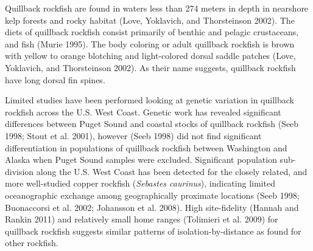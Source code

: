\documentclass[11pt,
  english,
  a4paper,
]{article}
\begin{document}

Quillback rockfish are found in waters less than 274 meters in depth in nearshore kelp forests and rocky habitat {(Love, Yoklavich, and Thorsteinson 2002)\leavevmode\tagmcend\tagstructend}. The diets of quillback rockfish consist primarily of benthic and pelagic crustaceans, and fish {(Murie 1995)\leavevmode\tagmcend\tagstructend}. The body coloring or adult quillback rockfish is brown with yellow to orange blotching and light-colored dorsal saddle patches {(Love, Yoklavich, and Thorsteinson 2002)\leavevmode\tagmcend\tagstructend}. As their name suggests, quillback rockfish have long dorsal fin spines.

\leavevmode\tagmcend\tagstructend\par


Limited studies have been performed looking at genetic variation in quillback rockfish across the U.S. West Coast. Genetic work has revealed significant differences between Puget Sound and coastal stocks of quillback rockfish {(Seeb 1998; Stout et al. 2001)\leavevmode\tagmcend\tagstructend}, however {(Seeb 1998)\leavevmode\tagmcend\tagstructend} did not find significant differentiation in populations of quillback rockfish between Washington and Alaska when Puget Sound samples were excluded. Significant population sub-division along the U.S. West Coast has been detected for the closely related, and more well-studied copper rockfish (\emph{Sebastes caurinus}), indicating limited oceanographic exchange among geographically proximate locations {(Seeb 1998; Buonaccorsi et al. 2002; Johansson et al. 2008)\leavevmode\tagmcend\tagstructend}. High site-fidelity {(Hannah and Rankin 2011)\leavevmode\tagmcend\tagstructend} and relatively small home ranges {(Tolimieri et al. 2009)\leavevmode\tagmcend\tagstructend} for quillback rockfish suggests similar patterns of isolation-by-distance as found for other rockfish.

\leavevmode\tagmcend\tagstructend\par
\end{document}
